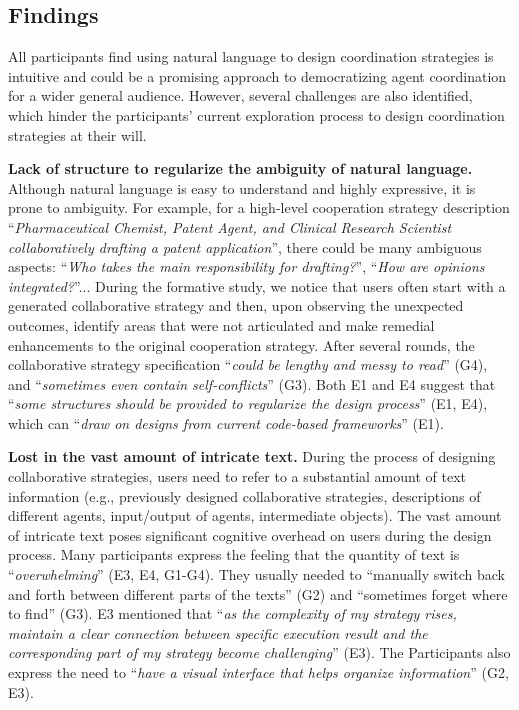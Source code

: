 \subsection{Findings}
All participants find using natural language to design coordination strategies is intuitive and could be a promising approach to democratizing agent coordination for a wider general audience. However, several challenges are also identified, which hinder the participants' current exploration process to design coordination strategies at their will.

\textbf{Lack of structure to regularize the ambiguity of natural language.} 
Although natural language is easy to understand and highly expressive, it is prone to ambiguity. For example, for a high-level cooperation strategy description ``\textit{Pharmaceutical Chemist, Patent Agent, and Clinical Research Scientist collaboratively drafting a patent application}'', there could be many ambiguous aspects: ``\textit{Who takes the main responsibility for drafting?}'', ``\textit{How are opinions integrated?}''... During the formative study, we notice that users often start with a generated collaborative strategy and then, upon observing the unexpected outcomes, identify areas that were not articulated and make remedial enhancements to the original cooperation strategy. After several rounds, the collaborative strategy specification ``\textit{could be lengthy and messy to read}'' (G4), and ``\textit{sometimes even contain self-conflicts}'' (G3). Both E1 and E4 suggest that ``\textit{some structures should be provided to regularize the design process}'' (E1, E4), which can ``\textit{draw on designs from current code-based frameworks}'' (E1).

\textbf{Lost in the vast amount of intricate text.} During the process of designing collaborative strategies, users need to refer to a substantial amount of text information (e.g., previously designed collaborative strategies, descriptions of different agents, input/output of agents, intermediate objects). The vast amount of intricate text poses significant cognitive overhead on users during the design process. Many participants express the feeling that the quantity of text is ``\textit{overwhelming}'' (E3, E4, G1-G4). They usually needed to ``manually switch back and forth between different parts of the texts'' (G2) and ``sometimes forget where to find'' (G3). E3 mentioned that ``\textit{as the complexity of my strategy rises, maintain a clear connection between specific execution result and the corresponding part of my strategy become challenging}'' (E3). The Participants also express the need to ``\textit{have a visual interface that helps organize information}'' (G2, E3).


